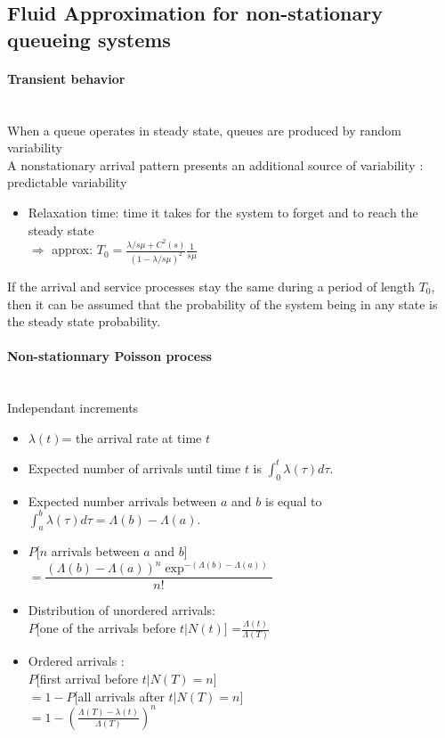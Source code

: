 \documentclass[paper=a4,fontsize=8pt,pagesize,DIV=calc]{scrartcl}
\newcounter{row}
\begin{document}
\begin{multicols}{3}
\section{Fluid Approximation for non-stationary queueing systems}
\paragraph{Transient behavior}~~\\
When a queue operates in steady state, queues are produced by random variability
\\A nonstationary arrival pattern presents an additional source of variability : predictable variability
\begin{itemize}
\item Relaxation time: time it takes for the system to forget  and to reach the steady state 
\\$\Rightarrow$ approx: $T_0=\frac{\lambda/s\mu+C^2(s)}{(1-\lambda/s\mu)^2}\frac{1}{ s\mu}$
\end{itemize}
If the arrival and service processes stay the same during a period of length $T_0$, then it can be assumed that the probability of the system being in any state is the steady state probability.
\paragraph{Non-stationnary Poisson process}
~~\\
Independant increments
\begin{itemize}
\item $\lambda(t)$= the arrival rate at time $t$
\item Expected number of arrivals until time $t$ is $\int_0^t \lambda(\tau)d\tau$.
\item Expected number arrivals between $a$ and $b$ is equal to $\int_a^b \lambda(\tau)d\tau=\Lambda(b)-\Lambda(a)$.
\item $P[n$ arrivals between $a$ and $b$]\\ $=\dfrac{(\Lambda(b)-\Lambda(a))^n \exp^{-(\Lambda(b)-\Lambda(a))}}{n!}$
\item Distribution of unordered arrivals:
\\$P[$one of the arrivals before $t|N(t)]$ =$\frac{\Lambda(t)}{\Lambda(T)}$
\item Ordered arrivals : 
\\$P[$first arrival before $t|N(T) = n]$\\ 
$= 1- P[$all arrivals after $ t|N(T) = n]$
\\$= 1-\left(\frac{\Lambda(T)-\lambda(t)}{\Lambda(T)}\right)^n$
\end{itemize}

\end{multicols}
\end{document}
